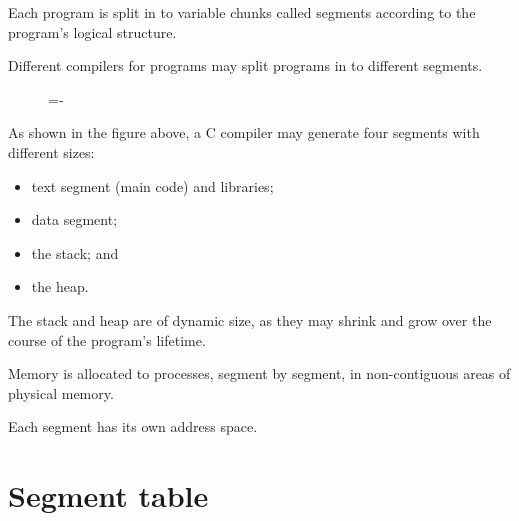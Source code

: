 \documentclass[a4paper]{systems-software}
\begin{document}
Each program is split in to variable chunks called segments according to the program's logical structure.

Different compilers for programs may split programs in to different segments.

\begin{figure}[H]
  \lineskip=-\fboxrule
\end{figure}

As shown in the figure above, a C compiler may generate four segments with different sizes:
\begin{itemize}
	\item text segment (main code) and libraries;
	\item data segment;
	\item the stack; and
	\item the heap.
\end{itemize}

The stack and heap are of dynamic size, as they may shrink and grow over the course of the program's lifetime.

Memory is allocated to processes, segment by segment, in non-contiguous areas of physical memory.

Each segment has its own address space.


\section*{Segment table}
\end{document}
